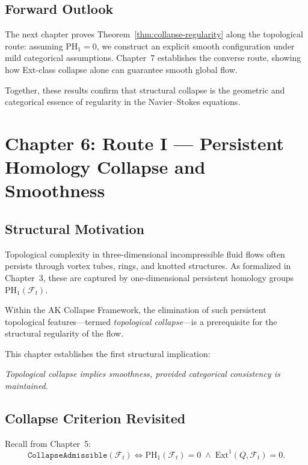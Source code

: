 \documentclass[11pt]{article}
\begin{document}
\subsection{Forward Outlook}

The next chapter proves Theorem~\ref{thm:collapse-regularity} along the topological route: assuming \( \mathrm{PH}_1 = 0 \), we construct an explicit smooth configuration under mild categorical assumptions. Chapter~7 establishes the converse route, showing how Ext-class collapse alone can guarantee smooth global flow.

Together, these results confirm that structural collapse is the geometric and categorical essence of regularity in the Navier--Stokes equations.



\section{Chapter 6: Route I — Persistent Homology Collapse and Smoothness}
\label{sec:topo-collapse-smoothness}

\subsection{Structural Motivation}

Topological complexity in three-dimensional incompressible fluid flows often persists through vortex tubes, rings, and knotted structures. As formalized in Chapter~3, these are captured by one-dimensional persistent homology groups \( \mathrm{PH}_1(\mathcal{F}_t) \). 

Within the AK Collapse Framework, the elimination of such persistent topological features—termed \emph{topological collapse}—is a prerequisite for the structural regularity of the flow.

This chapter establishes the first structural implication:
\begin{center}
\textit{Topological collapse implies smoothness, provided categorical consistency is maintained.}
\end{center}

\subsection{Collapse Criterion Revisited}

Recall from Chapter~5:
\[
\texttt{CollapseAdmissible}(\mathcal{F}_t) \iff \mathrm{PH}_1(\mathcal{F}_t) = 0 \;\wedge\; \mathrm{Ext}^1(Q, \mathcal{F}_t) = 0.
\]
\end{document}
